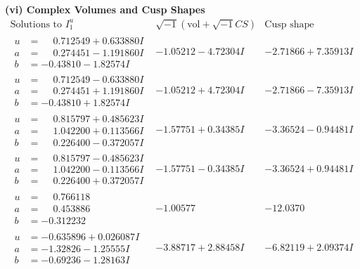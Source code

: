 \documentclass[1p]{elsarticle_modified}
\theoremstyle{definition}
\newcommand{\I}{\sqrt{-1}}
\begin{document}
\newpage\flushleft \textbf{(vi) Complex Volumes and Cusp Shapes}
$$\begin{array}{c|c|c}  
\text{Solutions to }I^u_{1}& \I (\text{vol} + \sqrt{-1}CS) & \text{Cusp shape}\\
 \hline 
\begin{aligned}
u &= \phantom{-}0.712549 + 0.633880 I \\
a &= \phantom{-}0.274451 - 1.191860 I \\
b &= -0.43810 - 1.82574 I\end{aligned}
 & -1.05212 - 4.72304 I & -2.71866 + 7.35913 I \\ \hline\begin{aligned}
u &= \phantom{-}0.712549 - 0.633880 I \\
a &= \phantom{-}0.274451 + 1.191860 I \\
b &= -0.43810 + 1.82574 I\end{aligned}
 & -1.05212 + 4.72304 I & -2.71866 - 7.35913 I \\ \hline\begin{aligned}
u &= \phantom{-}0.815797 + 0.485623 I \\
a &= \phantom{-}1.042200 + 0.113566 I \\
b &= \phantom{-}0.226400 - 0.372057 I\end{aligned}
 & -1.57751 + 0.34385 I & -3.36524 - 0.94481 I \\ \hline\begin{aligned}
u &= \phantom{-}0.815797 - 0.485623 I \\
a &= \phantom{-}1.042200 - 0.113566 I \\
b &= \phantom{-}0.226400 + 0.372057 I\end{aligned}
 & -1.57751 - 0.34385 I & -3.36524 + 0.94481 I \\ \hline\begin{aligned}
u &= \phantom{-}0.766118\phantom{ +0.000000I} \\
a &= \phantom{-}0.453886\phantom{ +0.000000I} \\
b &= -0.312232\phantom{ +0.000000I}\end{aligned}
 & -1.00577\phantom{ +0.000000I} & -12.0370\phantom{ +0.000000I} \\ \hline\begin{aligned}
u &= -0.635896 + 0.026087 I \\
a &= -1.32826 - 1.25555 I \\
b &= -0.69236 - 1.28163 I\end{aligned}
 & -3.88717 + 2.88458 I & -6.82119 + 2.09374 I \\ \hline\begin{aligned}

\end{aligned}
\end{array}$$
\end{document}
